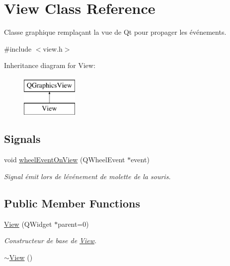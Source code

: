 \hypertarget{class_view}{}\section{View Class Reference}
\label{class_view}


Classe graphique remplaçant la vue de Qt pour propager les événements.  




{\ttfamily \#include $<$view.\+h$>$}

Inheritance diagram for View\+:\begin{figure}[H]
\begin{center}
\leavevmode
\includegraphics[height=2.000000cm]{class_view}
\end{center}
\end{figure}
\subsection*{Signals}
\begin{DoxyCompactItemize}
\item 
void \hyperlink{class_view_ac62e4287149000223df6f3608555c93a}{wheel\+Event\+On\+View} (Q\+Wheel\+Event $\ast$event)
\begin{DoxyCompactList}\small\item\em Signal émit lors de l\textquotesingle{}événement de molette de la souris. \end{DoxyCompactList}\end{DoxyCompactItemize}
\subsection*{Public Member Functions}
\begin{DoxyCompactItemize}
\item 
\hyperlink{class_view_a74d64dd513eae96bc3196131f865a4e8}{View} (Q\+Widget $\ast$parent=0)
\begin{DoxyCompactList}\small\item\em Constructeur de base de \hyperlink{class_view}{View}. \end{DoxyCompactList}\item 
\hyperlink{class_view_ad0dc854db9aabbea98a334dec89f785c}{$\sim$\+View} ()
\end{DoxyCompactItemize}

